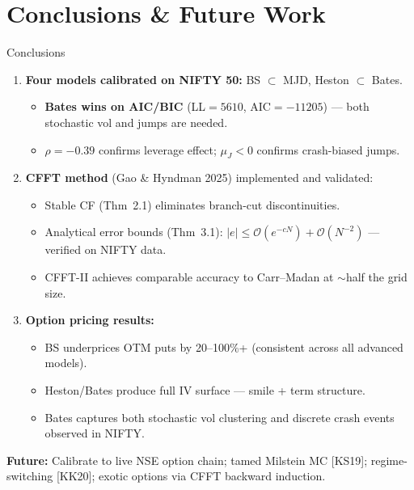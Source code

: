 \documentclass[10pt, aspectratio=169]{beamer}
\begin{document}
\section{Conclusions \& Future Work}

\begin{frame}{Conclusions}
\begin{enumerate}\setlength\itemsep{3pt}
  \item \textbf{Four models calibrated on NIFTY 50:} BS $\subset$ MJD, Heston $\subset$ Bates.
    \begin{itemize}
      \item \textbf{Bates wins on AIC/BIC} (LL$=5610$, AIC$=-11205$) --- both stochastic vol and jumps are needed.
      \item $\rho = -0.39$ confirms leverage effect; $\mu_J < 0$ confirms crash-biased jumps.
    \end{itemize}
  \item \textbf{CFFT method} (Gao \& Hyndman 2025) implemented and validated:
    \begin{itemize}
      \item Stable CF (Thm~2.1) eliminates branch-cut discontinuities.
      \item Analytical error bounds (Thm~3.1): $|e| \leq \mathcal{O}(e^{-cN}) + \mathcal{O}(N^{-2})$ --- verified on NIFTY data.
      \item CFFT-II achieves comparable accuracy to Carr--Madan at $\sim$half the grid size.
    \end{itemize}
  \item \textbf{Option pricing results:}
    \begin{itemize}
      \item BS underprices OTM puts by 20--100\%+ (consistent across all advanced models).
      \item Heston/Bates produce full IV surface --- smile + term structure.
      \item Bates captures both stochastic vol clustering and discrete crash events observed in NIFTY.
    \end{itemize}
\end{enumerate}

\vspace{3pt}
\textbf{Future:} Calibrate to live NSE option chain; tamed Milstein MC [KS19]; regime-switching [KK20]; exotic options via CFFT backward induction.
\end{frame}
\end{document}
